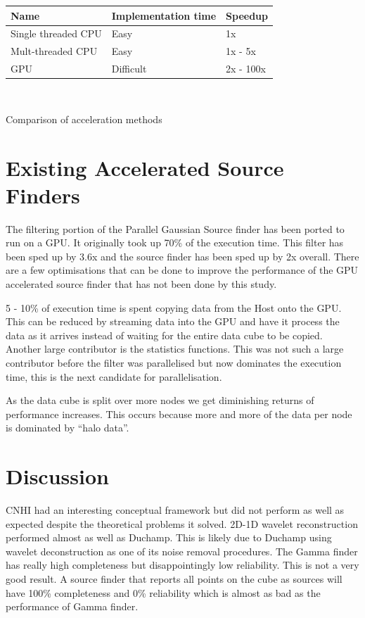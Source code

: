 \documentclass[prodmode,acmtecs]{acmsmall} \usepackage[ruled]{algorithm2e}
\begin{document}
{    \cite{laidler2013detection}
    

    \begin{tabular}{ |l|l|l| }
    \hline
    Name & Implementation time & Speedup \\
    \hline
      Single threaded CPU & Easy & 1x \\
    \hline
    Mult-threaded CPU & Easy & 1x - 5x  \\
    \hline
    GPU & Difficult & 2x - 100x  \\
      \hline
    \end{tabular}
    \\
\begin{center}    Comparison of acceleration methods\end{center}

\section{Existing Accelerated Source Finders}
The filtering portion of the Parallel Gaussian Source finder \cite{westerlund2015performance}
has been ported to run on a GPU. It originally took up 70\% of the execution time.
This filter has been sped up by 3.6x and the source finder has been sped up by 2x overall. 
There are a few optimisations that can be done to improve the performance of the GPU accelerated
source finder that has not been done by this study. 

5 - 10\% of execution time is spent copying data from the Host onto the GPU. This can be reduced by streaming
data into the GPU and have it process the data as it arrives instead of waiting for the entire
data cube to be copied. Another large contributor is the statistics functions. This was not such
a large contributor before the filter was parallelised but now dominates the execution time,
this is the next candidate for parallelisation. 

As the data cube is split over more nodes we get diminishing returns of performance increases.
This occurs because more and more of the data per node is dominated by ``halo data''.

\section{Discussion}
CNHI had an interesting conceptual framework 
but did not perform as well as expected despite the theoretical problems it solved. 2D-1D wavelet
reconstruction performed almost as well as Duchamp. This is likely due to Duchamp using wavelet deconstruction
as one of its noise removal procedures. The Gamma finder has really high completeness but disappointingly
low reliability. This is not a very good result. A source finder that reports all points on the cube as sources will
have 100\% completeness and 0\% reliability which is almost as bad as the performance of Gamma finder.

}
\end{document}
